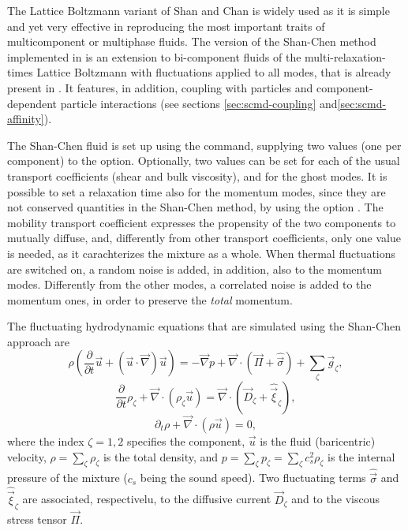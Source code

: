 The Lattice Boltzmann variant of Shan and Chan\cite{shan93a} is widely
used as it is simple and yet very effective in reproducing the most
important traits of multicomponent or multiphase fluids. The version
of the Shan-Chen method implemented in \es is an extension to
bi-component fluids of the multi-relaxation-times Lattice Boltzmann
with fluctuations applied to all modes, that is already present in
\es. It features, in addition, coupling with particles\cite{sega13c}
and component-dependent particle interactions (see sections
\ref{sec:scmd-coupling} and\ref{sec:scmd-affinity}).

The Shan-Chen fluid is set up using the  command, supplying two
values (one per component) to the  option. Optionally, two values can
be set for each of the usual transport coefficients  (shear and bulk
viscosity), and for the ghost modes. It is possible to set a relaxation time
also for the momentum modes, since they are not conserved quantities in the
Shan-Chen method, by using the option . The mobility transport
coefficient expresses the propensity of the two components to mutually diffuse,
and, differently from other transport coefficients, only one value is needed,
as it carachterizes the mixture as a whole. When thermal fluctuations are
switched on, a random noise is added, in addition, also to the momentum modes.
Differently from the other modes, a correlated noise is added to the momentum
ones, in order to preserve the \emph{total} momentum. 


The fluctuating hydrodynamic equations that are simulated using the
Shan-Chen approach are
\begin{equation}\label{eq:shanchen-NS}
\rho \left(\frac{\partial }{\partial  t} {\vec {u}} + ({\vec {u}}\cdot {\vec {\nabla}})  {\vec {u}} \right)=-{\vec {\nabla}} p+{\vec {\nabla}} \cdot ({\vec {\Pi}}+\hat{{\vec {\sigma}}})+\sum_{\zeta} {\vec {g}}_{\zeta},
\end{equation}
\begin{equation}\label{eq:shanchen-cont}
\frac{\partial }{\partial  t} \rho_{\zeta}+{\vec {\nabla}} \cdot (\rho_{\zeta} {\vec {u}}) = {\vec {\nabla}} \cdot  ({\vec {D}}_{\zeta}+\hat{{\vec {\xi}}}_{\zeta}),
\end{equation}
\begin{equation}\label{eq:shanchen-globalcont}
\partial_t \rho+{\vec {\nabla}} \cdot (\rho {\vec {u}}) = 0,
\end{equation}
where the index $\zeta=1,2$ specifies the component, $\vec{u}$ is
the fluid (baricentric) velocity, $\rho=\sum_\zeta\rho_\zeta$ is
the total density, and $p=\sum_{\zeta} p_{\zeta}=\sum_{\zeta} c_s^2
\rho_{\zeta}$ is the internal pressure of the mixture ($c_s$ being
the sound speed). Two fluctuating terms $\hat{{\vec{\sigma}}}$ and
$\hat{{\vec{\xi}}}_{\zeta}$ are associated, respectivelu, to the
diffusive current ${\vec{D}}_{\zeta}$ and to the viscous stress
tensor ${\vec{\Pi}}$.

